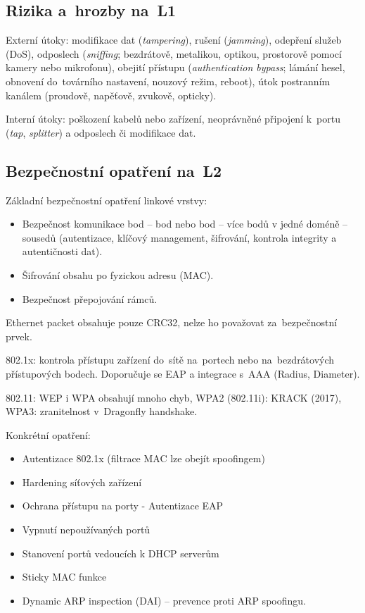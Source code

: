 \subsection{Rizika a~hrozby na~L1}

Externí útoky: modifikace dat (\emph{tampering}), rušení (\emph{jamming}), odepření služeb (DoS), odposlech (\emph{sniffing}; bezdrátově, metalikou, optikou, prostorově pomocí kamery nebo mikrofonu), obejití přístupu (\emph{authentication bypass}; lámání hesel, obnovení do~továrního nastavení, nouzový režim, reboot), útok postranním kanálem (proudově, napěťově, zvukově, opticky).

Interní útoky: poškození kabelů nebo zařízení, neoprávněné připojení k~portu (\emph{tap}, \emph{splitter}) a odposlech či modifikace dat.


\subsection{Bezpečnostní opatření na~L2}
Základní bezpečnostní opatření linkové vrstvy:
\begin{itemize}
    \item Bezpečnost komunikace bod – bod nebo bod – více bodů v
jedné doméně – sousedů (autentizace, klíčový management,
šifrování, kontrola integrity a autentičnosti dat).
    \item Šifrování obsahu po fyzickou adresu (MAC).
    \item Bezpečnost přepojování rámců.
\end{itemize}

Ethernet packet obsahuje pouze CRC32, nelze ho považovat za~bezpečnostní prvek.

802.1x: kontrola přístupu zařízení do~sítě na~portech nebo na~bezdrátových přístupových bodech.
Doporučuje se EAP a integrace s~AAA (Radius, Diameter).

802.11: WEP i WPA obsahují mnoho chyb, WPA2 (802.11i): KRACK (2017), WPA3: zranitelnost v~Dragonfly handshake.

Konkrétní opatření:
\begin{itemize}
    \item Autentizace 802.1x (filtrace MAC lze obejít spoofingem)
    \item Hardening síťových zařízení
    \item Ochrana přístupu na porty - Autentizace EAP
    \item Vypnutí nepoužívaných portů
    \item Stanovení portů vedoucích k DHCP serverům
    \item Sticky MAC funkce
    \item Dynamic ARP inspection (DAI) – prevence proti ARP spoofingu.  
\end{itemize}

